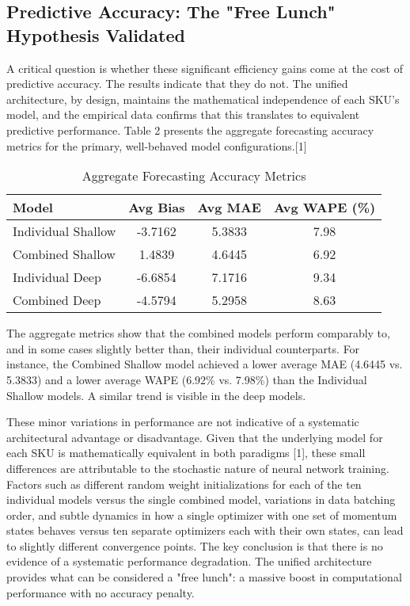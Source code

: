 \documentclass{article}
\begin{document}
\subsection{Predictive Accuracy: The "Free Lunch" Hypothesis Validated}

A critical question is whether these significant efficiency gains come at the cost of predictive accuracy. The results indicate that they do not. The unified architecture, by design, maintains the mathematical independence of each SKU's model, and the empirical data confirms that this translates to equivalent predictive performance. Table 2 presents the aggregate forecasting accuracy metrics for the primary, well-behaved model configurations.[1]

\begin{table}[h!]
\centering
\caption{Aggregate Forecasting Accuracy Metrics}
\begin{tabular}{@{}lccc@{}}
\toprule
Model & Avg Bias & Avg MAE & Avg WAPE (\%) \\
\midrule
Individual Shallow & -3.7162 & 5.3833 & 7.98 \\
Combined Shallow & 1.4839 & 4.6445 & 6.92 \\
Individual Deep & -6.6854 & 7.1716 & 9.34 \\
Combined Deep & -4.5794 & 5.2958 & 8.63 \\
\bottomrule
\end{tabular}
\label{tab:accuracy}
\end{table}

The aggregate metrics show that the combined models perform comparably to, and in some cases slightly better than, their individual counterparts. For instance, the Combined Shallow model achieved a lower average MAE (4.6445 vs. 5.3833) and a lower average WAPE (6.92\% vs. 7.98\%) than the Individual Shallow models. A similar trend is visible in the deep models.

These minor variations in performance are not indicative of a systematic architectural advantage or disadvantage. Given that the underlying model for each SKU is mathematically equivalent in both paradigms [1], these small differences are attributable to the stochastic nature of neural network training. Factors such as different random weight initializations for each of the ten individual models versus the single combined model, variations in data batching order, and subtle dynamics in how a single optimizer with one set of momentum states behaves versus ten separate optimizers each with their own states, can lead to slightly different convergence points. The key conclusion is that there is no evidence of a systematic performance degradation. The unified architecture provides what can be considered a "free lunch": a massive boost in computational performance with no accuracy penalty.
\end{document}
